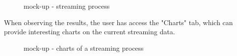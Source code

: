 \documentclass[a4paper,11pt]{report}
\begin{document}
\begin{figure}[H]
\begin{center}
\caption{mock-up - streaming process}
\end{center}
\end{figure}
\vspace*{\fill}
\newpage
\vspace*{\fill}
When observing the results, the user has access the "Charts" tab, which can provide interesting charts on the current streaming data.
\bigskip
\begin{figure}[H]
\begin{center}
\caption{mock-up - charts of a streaming process}
\end{center}
\end{figure}
\end{document}
